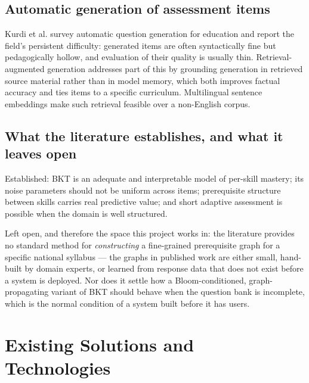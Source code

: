 \subsection{Automatic generation of assessment items}

Kurdi et al. \cite{kurdi2020systematic} survey automatic question generation for
education and report the field's persistent difficulty: generated items are
often syntactically fine but pedagogically hollow, and evaluation of their
quality is usually thin. Retrieval-augmented generation
\cite{lewis2020retrieval} addresses part of this by grounding generation in
retrieved source material rather than in model memory, which both improves
factual accuracy and ties items to a specific curriculum. Multilingual sentence
embeddings \cite{reimers2019sentence} make such retrieval feasible over a
non-English corpus.

\subsection{What the literature establishes, and what it leaves open}

Established: BKT is an adequate and interpretable model of per-skill mastery;
its noise parameters should not be uniform across items; prerequisite structure
between skills carries real predictive value; and short adaptive assessment is
possible when the domain is well structured.

Left open, and therefore the space this project works in: the literature
provides no standard method for \emph{constructing} a fine-grained prerequisite
graph for a specific national syllabus --- the graphs in published work are
either small, hand-built by domain experts, or learned from response data that
does not exist before a system is deployed. Nor does it settle how a
Bloom-conditioned, graph-propagating variant of BKT should behave when the
question bank is incomplete, which is the normal condition of a system built
before it has users.

\section{Existing Solutions and Technologies}
\label{sec:related}

